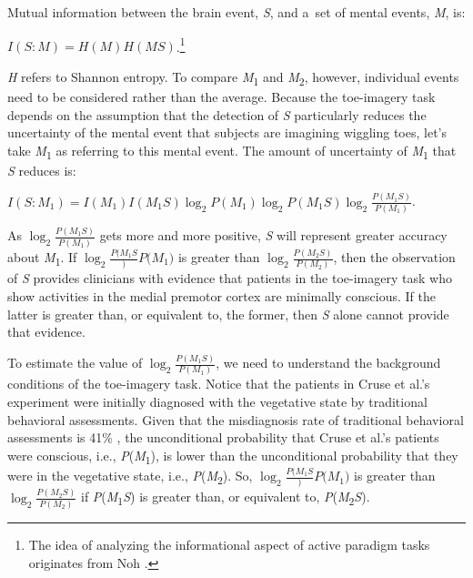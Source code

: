 Mutual information between the brain event, \textit{S}, and a~set of mental events, \textit{M}, is:

$I(S:M)=H(M)H(MS)$.\footnote{ The idea of analyzing the informational aspect of active paradigm tasks originates from Noh
\parencite*[][pp.181–185]{noh_no-report_2018}.%
}


\textit{H} refers to Shannon entropy. To compare \textit{M}\textsubscript{1} and \textit{M}\textsubscript{2}, however, individual events need to be considered rather than the average. Because the toe-imagery task depends on the assumption that the detection of \textit{S} particularly reduces the uncertainty of the mental event that subjects are imagining wiggling toes, let's take \textit{M}\textsubscript{1} as referring to this mental event. The amount of uncertainty of \textit{M}\textsubscript{1} that \textit{S} reduces is:

$I(S:M_1)=I(M_1)I(M_1S)\log _2P(M_1)\log _2P(M_1S)\log _2\frac{P(M_1S)}{P(M_1)}$.


As $\log _2\frac{P(M_1S)}{P(M_1)}$ gets more and more positive, \textit{S} will represent greater accuracy about \textit{M}\textsubscript{1}. If $\log _2\frac{P(M_1S}){P(M_1})$ is greater than $\log _2\frac{P(M_2S)}{P(M_2)}$, then the observation of \textit{S} provides clinicians with evidence that patients in the toe-imagery task who show activities in the medial premotor cortex are minimally conscious. If the latter is greater than, or equivalent to, the former, then \textit{S} alone cannot provide that evidence.

To estimate the value of $\log _2\frac{P(M_1S)}{P(M_1)}$, we need to understand the background conditions of the toe-imagery task. Notice that the patients in Cruse et al.'s
\parencite*[][]{cruse_bedside_2011} %
 experiment were initially diagnosed with the vegetative state by traditional behavioral assessments. Given that the misdiagnosis rate of traditional behavioral assessments is 41\% 
\parencite[][]{schnakers_diagnostic_2009}, %
 the unconditional probability that Cruse et al.'s patients were conscious, i.e., \textit{P}(\textit{M}\textsubscript{1}), is lower than the unconditional probability that they were in the vegetative state, i.e., \textit{P}(\textit{M}\textsubscript{2}). So, $\log _2\frac{P(M_1S}){P(M_1})$ is greater than $\log _2\frac{P(M_2S)}{P(M_2)}$ if \textit{P}(\textit{M}\textsubscript{1}{\textbar}\textit{S}) is greater than, or equivalent to, \textit{P}(\textit{M}\textsubscript{2}{\textbar}\textit{S}).

